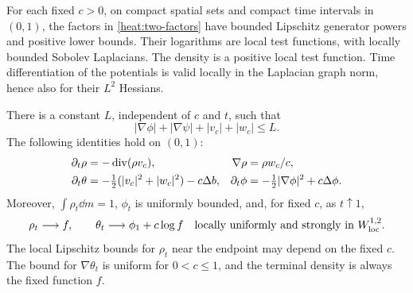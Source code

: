\begin{lemma}
\label{heat:regularity}
For each fixed \(c>0\), on compact spatial sets and compact
time intervals in \((0,1)\), the factors in
\eqref{heat:two-factors} have bounded Lipschitz generator powers
and positive lower bounds. Their logarithms are local test
functions, with locally bounded Sobolev Laplacians. The density
is a positive local test function. Time differentiation of the
potentials is valid locally in the Laplacian graph norm, hence
also for their \(L^2\) Hessians.

There is a constant \(L\), independent of \(c\) and \(t\), such
that
\begin{equation}
\label{heat:uniform-gradients}
|\nabla\phi|+|\nabla\psi|+|v_c|+|w_c|\le L.
\end{equation}
The following identities hold on \((0,1)\):
\begin{align}
\label{heat:continuity}
\partial_t\rho&=-\operatorname{div}(\rho v_c),&
\nabla\rho&=\rho w_c/c,\\
\label{heat:hamilton-jacobi}
\partial_t\theta&=-\tfrac12(|v_c|^2+|w_c|^2)-c\Delta b,&
\partial_t\phi&=-\tfrac12|\nabla\phi|^2+c\Delta\phi.
\end{align}
Moreover, \(\int\rho_t\dd m=1\), \(\phi_t\) is uniformly
bounded, and, for fixed \(c\), as \(t\uparrow1\),
\begin{equation}
\label{heat:terminal-traces}
\rho_t\longrightarrow f,\qquad
\theta_t\longrightarrow\phi_1+c\log f
\quad\text{locally uniformly and strongly in }W^{1,2}_{\rm loc}.
\end{equation}
The local Lipschitz bounds for \(\rho_t\) near the endpoint
may depend on the fixed \(c\). The bound for
\(\nabla\theta_t\) is uniform for \(0<c\le1\), and the
terminal density is always the fixed function \(f\).
\end{lemma}


